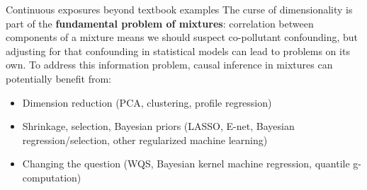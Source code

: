 \begin{frame}[t]{Continuous exposures beyond textbook examples}
The curse of dimensionality is part of the \textbf{fundamental problem of mixtures}: correlation between components of a mixture means we should suspect co-pollutant confounding, but adjusting for that confounding in statistical models can lead to problems on its own. To address this information problem, causal inference in mixtures can potentially benefit from: 
\bigskip

    \begin{itemize}
      \item Dimension reduction (PCA, clustering, profile regression)
      \item Shrinkage, selection, Bayesian priors (LASSO, E-net, Bayesian regression/selection, other regularized machine learning)
      \item {Changing the question} (WQS, Bayesian kernel machine regression, quantile g-computation)
    \end{itemize}


\end{frame}



